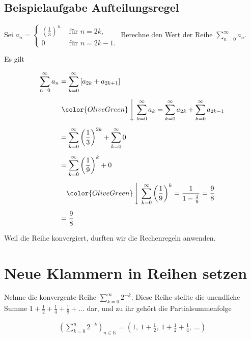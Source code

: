 \documentclass[fontsize=9pt,
               parskip=half-,
               DIV=14,
               listof=chapterentry,
               tocflat]{scrbook}
\begin{document}
\subsection{Beispielaufgabe Aufteilungsregel}

\begin{exercise*}
Sei $a_{n}={\begin{cases}({\frac {1}{3}})^{n}&{\text{ für }}n=2k,\\0&{\text{ für }}n=2k-1.\end{cases}}$ Berechne den Wert der Reihe $\sum _{n=0}^{\infty }a_{n}$.

\end{exercise*}

\begin{solution*}
Es gilt

\begin{align*}
\sum _{n=0}^{\infty }a_{n}&=\sum _{k=0}^{\infty }\left[a_{2k}+a_{2k+1}\right]\\[0.5em]&\ {\color {OliveGreen}\left\downarrow \ \sum _{k=0}^{\infty }a_{k}=\sum _{k=0}^{\infty }a_{2k}+\sum _{k=0}^{\infty }a_{2k-1}\right.}\\[0.5em]&=\sum _{k=0}^{\infty }\left({\frac {1}{3}}\right)^{2k}+\sum _{k=0}^{\infty }0\\[0.5em]&=\sum _{k=0}^{\infty }\left({\frac {1}{9}}\right)^{k}+0\\[0.5em]&\quad {\color {OliveGreen}\left\downarrow \ \sum _{k=0}^{\infty }\left({\frac {1}{9}}\right)^{k}={\frac {1}{1-{\frac {1}{9}}}}={\frac {9}{8}}\right.}\\[0.5em]&={\frac {9}{8}}
\end{align*}

Weil die Reihe konvergiert, durften wir die Rechenregeln anwenden.

\end{solution*}

\section{Neue Klammern in Reihen setzen}

Nehme die konvergente Reihe $\sum _{k=0}^{\infty }2^{-k}$. Diese Reihe stellte die unendliche Summe $1+{\tfrac {1}{2}}+{\tfrac {1}{4}}+{\tfrac {1}{8}}+\ldots $ dar, und zu ihr gehört die Partialsummenfolge

\begin{align*}
\left(\sum _{k=0}^{n}2^{-k}\right)_{n\in \mathbb {N} }=\left(1,\ 1+{\frac {1}{2}},\ 1+{\frac {1}{2}}+{\frac {1}{4}},\ \ldots \right)
\end{align*}
\end{document}
